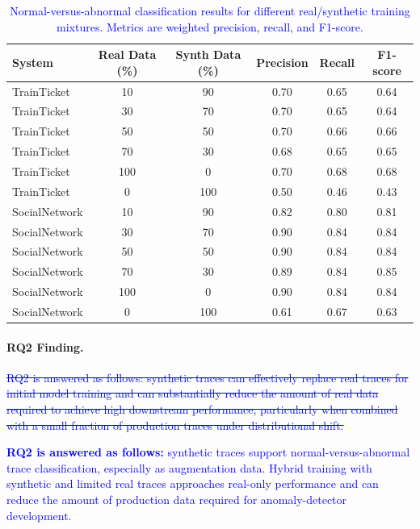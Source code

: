 \documentclass[sigconf,review]{acmart}
\begin{document}
\begin{table}[t]
    \centering
    \begingroup
    \color{blue}
    \begin{tabular}{lccccc}
        \textbf{System} & \textbf{Real Data (\%)} & \textbf{Synth Data (\%)} & \textbf{Precision} & \textbf{Recall} & \textbf{F1-score} \\
        \hline
        TrainTicket & 10 & 90 & 0.70 & 0.65 & 0.64 \\
        TrainTicket & 30 & 70 & 0.70 & 0.65 & 0.64 \\
        TrainTicket & 50 & 50 & 0.70 & 0.66 & 0.66 \\
        TrainTicket & 70 & 30 & 0.68 & 0.65 & 0.65 \\
        TrainTicket & 100 & 0 & 0.70 & 0.68 & 0.68 \\
        TrainTicket & 0 & 100 & 0.50 & 0.46 & 0.43 \\
        \hline
        SocialNetwork & 10 & 90 & 0.82 & 0.80 & 0.81 \\
        SocialNetwork & 30 & 70 & 0.90 & 0.84 & 0.84 \\
        SocialNetwork & 50 & 50 & 0.90 & 0.84 & 0.84 \\
        SocialNetwork & 70 & 30 & 0.89 & 0.84 & 0.85 \\
        SocialNetwork & 100 & 0 & 0.90 & 0.84 & 0.84 \\
        SocialNetwork & 0 & 100 & 0.61 & 0.67 & 0.63 \\
    \end{tabular}
    \endgroup
    \caption{\textcolor{blue}{Normal-versus-abnormal classification results for different real/synthetic training mixtures. Metrics are weighted precision, recall, and F1-score.}}
    \label{tab:normal-abnormal-classification}
\end{table}

\paragraph{RQ2 Finding.}
\textcolor{blue}{\sout{RQ2 is answered as follows: synthetic traces can effectively replace real traces for initial model training and can substantially reduce the amount of real data required to achieve high downstream performance, particularly when combined with a small fraction of production traces under distributional shift.}}

\textcolor{blue}{\textbf{RQ2 is answered as follows:} synthetic traces support normal-versus-abnormal trace classification, especially as augmentation data. Hybrid training with synthetic and limited real traces approaches real-only performance and can reduce the amount of production data required for anomaly-detector development.}
\end{document}
